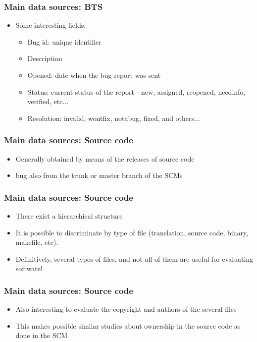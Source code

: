\documentclass{beamer}
\begin{document}
\begin{frame}
 \frametitle{Main data sources: BTS}
 \begin{itemize}
 \item Some interesting fields:
   \begin{itemize}
    \item Bug id: unique identifier
    \item Description
    \item Opened: date when the bug report was sent
    \item Status: current status of the report - new, assigned, reopened, needinfo, verified, etc...
    \item Resolution: invalid, wontfix, notabug, fixed, and others...
 \end{itemize}

 \end{itemize}
\end{frame}

\begin{frame}
 \frametitle{Main data sources: Source code}
 \begin{itemize}
 \item Generally obtained by means of the releases of source code
 \item bug also from the trunk or master branch of the SCMs

 \end{itemize}

\end{frame}

\begin{frame}
 \frametitle{Main data sources: Source code}
 \begin{itemize}
 \item There exist a hierarchical structure
 \item It is possible to discriminate by type of file (translation, source code, binary, makefile, etc).
 \item Definitively, several types of files, and not all of them are useful for evaluating software!

 \end{itemize}

\end{frame}



\begin{frame}
 \frametitle{Main data sources: Source code}
 \begin{itemize}
 \item Also interesting to evaluate the copyright and authors of 
  the several files
 \item This makes possible similar studies about ownership in the source code as done in the SCM
 \end{itemize}

\end{frame}
\end{document}
